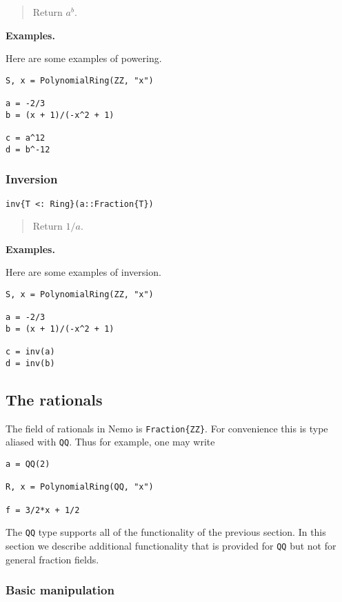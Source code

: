 \documentclass[a4paper,10pt]{article}
\newcommand{\code}{\lstinline}
\newcommand{\desc}[1]{\vspace{-3mm}\begin{quote}#1\end{quote}}
\begin{document}
{{{\desc{Return $a^b$.}

\textbf{Examples.}

Here are some examples of powering.

\begin{lstlisting}
S, x = PolynomialRing(ZZ, "x")

a = -2/3
b = (x + 1)/(-x^2 + 1)

c = a^12
d = b^-12
\end{lstlisting}

\subsubsection{Inversion}

\begin{lstlisting}
inv{T <: Ring}(a::Fraction{T})
\end{lstlisting}

\desc{Return $1/a$.}

\textbf{Examples.}

Here are some examples of inversion.

\begin{lstlisting}
S, x = PolynomialRing(ZZ, "x")

a = -2/3
b = (x + 1)/(-x^2 + 1)

c = inv(a)
d = inv(b)
\end{lstlisting}

\subsection{The rationals}

The field of rationals in Nemo is \code|Fraction{ZZ}|. For convenience this is
type aliased with \code{QQ}. Thus for example, one may write

\begin{lstlisting}
a = QQ(2)

R, x = PolynomialRing(QQ, "x")

f = 3/2*x + 1/2
\end{lstlisting}

The \code{QQ} type supports all of the functionality of the previous section. In
this section we describe additional functionality that is provided for \code{QQ}
but not for general fraction fields.

\subsubsection{Basic manipulation}

}}}
\end{document}
